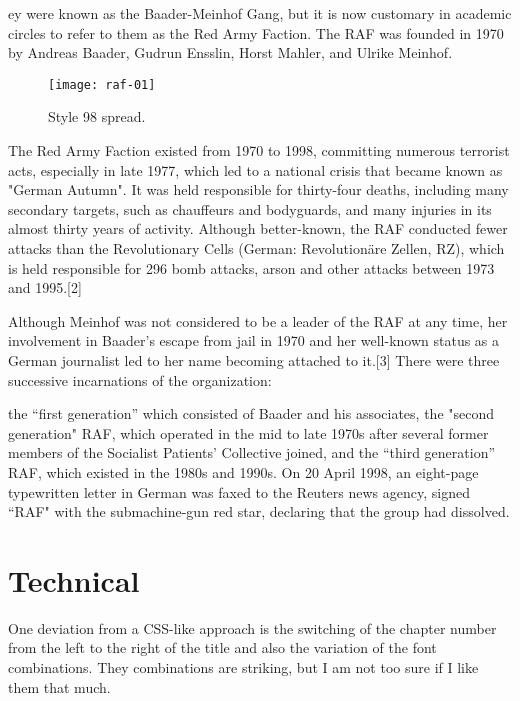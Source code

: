  ey were known as the Baader-Meinhof Gang, but it is now customary in academic circles to refer to them as the Red Army Faction. The RAF was founded in 1970 by Andreas Baader, Gudrun Ensslin, Horst Mahler, and Ulrike Meinhof.

\begin{figure}[ht]
\centering
\texttt{[image: raf-01]}
\caption{Style 98 spread.}
\end{figure}

The Red Army Faction existed from 1970 to 1998, committing numerous terrorist acts, especially in late 1977, which led to a national crisis that became known as "German Autumn". It was held responsible for thirty-four deaths, including many secondary targets, such as chauffeurs and bodyguards, and many injuries in its almost thirty years of activity. Although better-known, the RAF conducted fewer attacks than the Revolutionary Cells (German: Revolutionäre Zellen, RZ), which is held responsible for 296 bomb attacks, arson and other attacks between 1973 and 1995.[2]

Although Meinhof was not considered to be a leader of the RAF at any time, her involvement in Baader's escape from jail in 1970 and her well-known status as a German journalist led to her name becoming attached to it.[3]
There were three successive incarnations of the organization:

the “first generation” which consisted of Baader and his associates,
the "second generation" RAF, which operated in the mid to late 1970s after several former members of the Socialist Patients' Collective joined, and
the “third generation” RAF, which existed in the 1980s and 1990s.
On 20 April 1998, an eight-page typewritten letter in German was faxed to the Reuters news agency, signed “RAF" with the submachine-gun red star, declaring that the group had dissolved. 
 
\section{Technical}
 
One deviation from a CSS-like approach is the switching of the chapter number from the left to the right of the title
and also the variation of the font combinations. They combinations are striking, but I am not too sure if I like them that much.

\makeatletter\@specialfalse\makeatother    